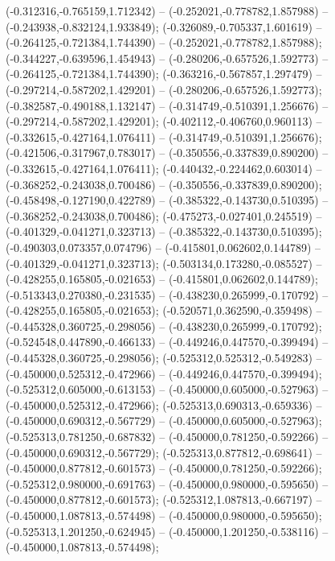  (-0.312316,-0.765159,1.712342) -- (-0.252021,-0.778782,1.857988) -- (-0.243938,-0.832124,1.933849);
 (-0.326089,-0.705337,1.601619) -- (-0.264125,-0.721384,1.744390) -- (-0.252021,-0.778782,1.857988);
 (-0.344227,-0.639596,1.454943) -- (-0.280206,-0.657526,1.592773) -- (-0.264125,-0.721384,1.744390);
 (-0.363216,-0.567857,1.297479) -- (-0.297214,-0.587202,1.429201) -- (-0.280206,-0.657526,1.592773);
 (-0.382587,-0.490188,1.132147) -- (-0.314749,-0.510391,1.256676) -- (-0.297214,-0.587202,1.429201);
 (-0.402112,-0.406760,0.960113) -- (-0.332615,-0.427164,1.076411) -- (-0.314749,-0.510391,1.256676);
 (-0.421506,-0.317967,0.783017) -- (-0.350556,-0.337839,0.890200) -- (-0.332615,-0.427164,1.076411);
 (-0.440432,-0.224462,0.603014) -- (-0.368252,-0.243038,0.700486) -- (-0.350556,-0.337839,0.890200);
 (-0.458498,-0.127190,0.422789) -- (-0.385322,-0.143730,0.510395) -- (-0.368252,-0.243038,0.700486);
 (-0.475273,-0.027401,0.245519) -- (-0.401329,-0.041271,0.323713) -- (-0.385322,-0.143730,0.510395);
 (-0.490303,0.073357,0.074796) -- (-0.415801,0.062602,0.144789) -- (-0.401329,-0.041271,0.323713);
 (-0.503134,0.173280,-0.085527) -- (-0.428255,0.165805,-0.021653) -- (-0.415801,0.062602,0.144789);
 (-0.513343,0.270380,-0.231535) -- (-0.438230,0.265999,-0.170792) -- (-0.428255,0.165805,-0.021653);
 (-0.520571,0.362590,-0.359498) -- (-0.445328,0.360725,-0.298056) -- (-0.438230,0.265999,-0.170792);
 (-0.524548,0.447890,-0.466133) -- (-0.449246,0.447570,-0.399494) -- (-0.445328,0.360725,-0.298056);
 (-0.525312,0.525312,-0.549283) -- (-0.450000,0.525312,-0.472966) -- (-0.449246,0.447570,-0.399494);
 (-0.525312,0.605000,-0.613153) -- (-0.450000,0.605000,-0.527963) -- (-0.450000,0.525312,-0.472966);
 (-0.525313,0.690313,-0.659336) -- (-0.450000,0.690312,-0.567729) -- (-0.450000,0.605000,-0.527963);
 (-0.525313,0.781250,-0.687832) -- (-0.450000,0.781250,-0.592266) -- (-0.450000,0.690312,-0.567729);
 (-0.525313,0.877812,-0.698641) -- (-0.450000,0.877812,-0.601573) -- (-0.450000,0.781250,-0.592266);
 (-0.525312,0.980000,-0.691763) -- (-0.450000,0.980000,-0.595650) -- (-0.450000,0.877812,-0.601573);
 (-0.525312,1.087813,-0.667197) -- (-0.450000,1.087813,-0.574498) -- (-0.450000,0.980000,-0.595650);
 (-0.525313,1.201250,-0.624945) -- (-0.450000,1.201250,-0.538116) -- (-0.450000,1.087813,-0.574498);
